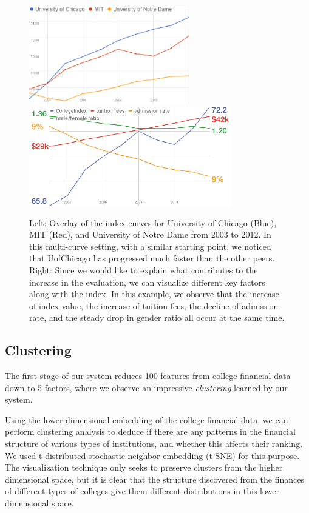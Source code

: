 \documentclass[11pt,letter]{article}
\begin{document}
\begin{figure}[H]
\centering
\includegraphics[height=1.7in]{multiple_index_curves.png}
\includegraphics[height=1.7in]{other_data.pdf}
\caption{Left: Overlay of the index curves for University of Chicago (Blue), MIT (Red), and University of Notre Dame from 2003 to 2012. In this multi-curve setting, with a similar starting point, we noticed that UofChicago has progressed much faster than the other peers. Right: Since we would like to explain what contributes to the increase in the evaluation, we can visualize different key factors along with the index. In this example, we observe that the increase of index value, the increase of tuition fees, the decline of admission rate, and the steady drop in gender ratio all occur at the same time.} 
\label{fig:curves}
\end{figure}



\subsection{Clustering}

The first stage of our system reduces 100 features from college financial data down to 5 factors, where we observe an impressive \emph{clustering} learned by our system. 

\noindent Using the lower dimensional embedding of the college financial data, we can perform clustering analysis to deduce if there are any patterns in the financial structure of various types of institutions, and whether this affects their ranking. We used t-distributed stochastic neighbor embedding (t-SNE) for this purpose. The visualization technique only seeks to preserve clusters from the higher dimensional space, but it is clear that the structure discovered from the finances of different types of colleges give them different distributions in this lower dimensional space.
\end{document}
